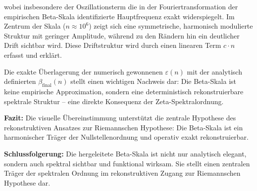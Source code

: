 \documentclass[11pt]{article}
\begin{document}
\begin{enumerate}
wobei insbesondere der Oszillationsterm die in der Fouriertransformation der empirischen Beta-Skala identifizierte Hauptfrequenz exakt widerspiegelt. Im Zentrum der Skala ($n \approx 10^6$) zeigt sich eine symmetrische, harmonisch modulierte Struktur mit geringer Amplitude, während zu den Rändern hin ein deutlicher Drift sichtbar wird. Diese Driftstruktur wird durch einen linearen Term $c \cdot n$ erfasst und erklärt.

Die exakte Überlagerung der numerisch gewonnenen $\varepsilon(n)$ mit der analytisch definierten $\beta_{\text{final}}(n)$ stellt einen wichtigen Nachweis dar: Die Beta-Skala ist keine empirische Approximation, sondern eine deterministisch rekonstruierbare spektrale Struktur – eine direkte Konsequenz der Zeta-Spektralordnung.

\textbf{Fazit:} Die visuelle Übereinstimmung unterstützt die zentrale Hypothese des rekonstruktiven Ansatzes zur Riemannschen Hypothese: Die Beta-Skala ist ein harmonischer Träger der Nullstellenordnung und operativ exakt rekonstruierbar.
\end{enumerate}

\textbf{Schlussfolgerung:} Die hergeleitete Beta-Skala ist nicht nur analytisch elegant, sondern auch spektral sichtbar und funktional wirksam. Sie stellt einen zentralen Träger der spektralen Ordnung im rekonstruktiven Zugang zur Riemannschen Hypothese dar.
\end{document}
